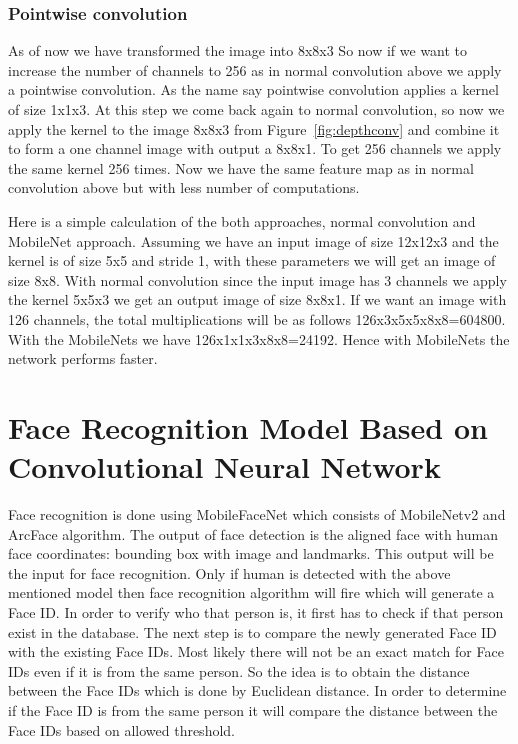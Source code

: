 \subsubsection{Pointwise convolution}
As of now we have transformed the image into 8x8x3
So now if we want to increase the number of channels to 256 as in normal convolution above we apply a pointwise convolution. As the name say pointwise convolution applies a kernel of size 1x1x3. At this step we come back again to normal convolution, so now we apply the kernel to the image 8x8x3 from Figure~\ref{fig:depthconv} and combine it to form a one channel image with output a 8x8x1. To get 256 channels we apply the same kernel 256 times. Now we have the same feature map as in normal convolution above but with less number of computations. 

Here is a simple calculation of the both approaches, normal convolution and MobileNet approach. 
Assuming we have an input image of size 12x12x3 and the kernel is of size 5x5 and stride 1, with these parameters we will get an image of size 8x8.
With normal convolution since the input image has 3 channels we apply the kernel 5x5x3 we get an output image of size 8x8x1. If we want an image with 126 channels, the total multiplications will be as follows 126x3x5x5x8x8=604800. With the MobileNets we have 126x1x1x3x8x8=24192. Hence with MobileNets the network performs faster.


\section{Face Recognition Model Based on Convolutional Neural Network}

Face recognition is done using MobileFaceNet which consists of MobileNetv2 and ArcFace algorithm. The output of face detection is the aligned face with human face coordinates: bounding box with image and landmarks. This output will be the input for face recognition. Only if human is detected with the above mentioned model then face recognition algorithm will fire which will generate a Face ID. In order to verify who that person is, it first has to check if that person exist in the database. The next step is to compare the newly generated Face ID with the existing Face IDs. Most likely there will not be an exact match for Face IDs even if it is from the same person. So the idea is to obtain the distance between the Face IDs which is done by Euclidean distance. In order to determine if the Face ID is from the same person it will compare the distance between the Face IDs based on allowed threshold. 

